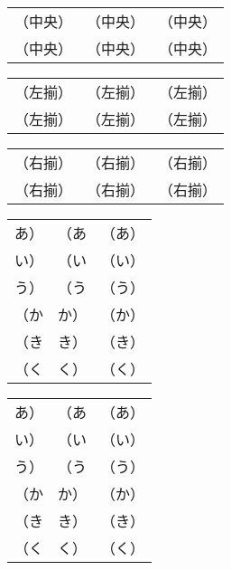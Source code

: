 \documentclass[twocolumn]{jarticle}
\begin{document}
\begin{tabular}{|c|c|c|}
\mbox{（中央）} & \mbox{（中央）} & \mbox{（中央）} \\
\mbox{（中央）} & \mbox{（中央）} & \mbox{（中央）}
\end{tabular}

\begin{tabular}{|l|l|l|}
\mbox{（左揃）} & \mbox{（左揃）} & \mbox{（左揃）} \\
\mbox{（左揃）} & \mbox{（左揃）} & \mbox{（左揃）}
\end{tabular}

\begin{tabular}{|r|r|r|}
\mbox{（右揃）} & \mbox{（右揃）} & \mbox{（右揃）} \\
\mbox{（右揃）} & \mbox{（右揃）} & \mbox{（右揃）}
\end{tabular}

\newpage


\begin{tabular}{|p{}|p{}|p{}|}
あ） & （あ & （あ） \\    %
い）\<&\<（い&\<（い）\<\\ %
う）&（う&（う）\\         %
（か & か） & （か） \\    %
（き\<&\<き）&\<（き）\<\\ %
（く&く）&（く）\\         %
\end{tabular}


\begin{tabular}{|p{}|p{}|p{}|}
\mbox{あ）} & \mbox{（あ} & \mbox{（あ）} \\
\mbox{い）}\<&\<\mbox{（い}&\<\mbox{（い）}\<\\
\mbox{う）}&\mbox{（う}&\mbox{（う）}\\
\mbox{（か} & \mbox{か）} & \mbox{（か）} \\
\mbox{（き}\<&\<\mbox{き）}&\<\mbox{（き）}\<\\
\mbox{（く}&\mbox{く）}&\mbox{（く）}\\
\end{tabular}
\end{document}
